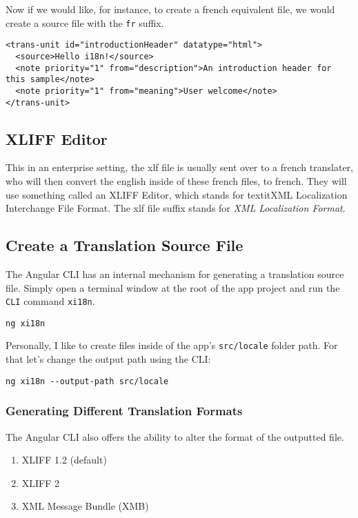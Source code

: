 Now if we would like, for instance, to create a french equivalent file, we would 
create a source file with the \lstinline{fr} suffix. 

\begin{lstlisting}[caption=src/locale/messages.fr.xlf]
<trans-unit id="introductionHeader" datatype="html">
  <source>Hello i18n!</source>
  <note priority="1" from="description">An introduction header for this sample</note>
  <note priority="1" from="meaning">User welcome</note>
</trans-unit>
\end{lstlisting}

\subsection{XLIFF Editor}
This in an enterprise setting, the xlf file is usually sent over to a french
translater, who will then convert the english inside of these french files, to
french. They will use something called an XLIFF Editor, which stands for textit{XML 
Localization Interchange File Format}. The xlf file suffix stands for 
\textit{XML Localization Format}.

\subsection{Create a Translation Source File}
The Angular CLI has an internal mechanism for generating a translation source file.
Simply open a terminal window at the root of the app project and run the 
\lstinline{CLI} command \lstinline{xi18n}.
\begin{verbatim}
ng xi18n 
\end{verbatim}

Personally, I like to create files inside of the app's \lstinline{src/locale} 
folder path. For that let's change the output path using the CLI: 
\begin{verbatim}
ng xi18n --output-path src/locale  
\end{verbatim}

\subsubsection{Generating Different Translation Formats}
The Angular CLI also offers the ability to alter the format of the outputted 
file. 
\begin{enumerate}
  \item XLIFF 1.2 (default)
  \item XLIFF 2
  \item XML Message Bundle (XMB)
\end{enumerate}

